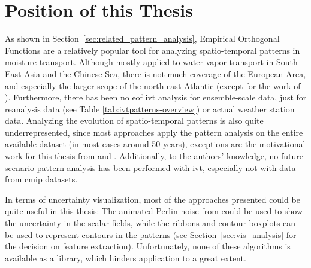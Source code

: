 %
%
%
%


\section{Position of this Thesis} %
\label{sec:Position of this Thesis}

As shown in Section~\ref{sec:related_pattern_analysis}, Empirical Orthogonal Functions are a relatively popular tool for analyzing spatio-temporal patterns in moisture transport. 
Although mostly applied to water vapor transport in South East Asia and the Chinese Sea, there is not much coverage of the European Area, and especially the larger scope of the north-east Atlantic (except for the work of \citeauthor{wypych_atmospheric_2018} \cite{wypych_atmospheric_2018}). 
Furthermore, there has been no \ac{eof} \ac{ivt} analysis for ensemble-scale data, just for reanalysis data (see Table \ref{tab:ivtpatterns-overview}) or actual weather station data.
Analyzing the evolution of spatio-temporal patterns is also quite underrepresented, since most approaches apply the pattern analysis on the entire available dataset (in most cases around 50 years), exceptions are the motivational work for this thesis from  and . 
Additionally, to the authors' knowledge, no future scenario pattern analysis has been performed with \ac{ivt}, especially not with data from \ac{cmip} datasets.  

In terms of uncertainty visualization, most of the approaches presented could be quite useful in this thesis: The animated Perlin noise from \cite{coninx_visualization_2011} could be used to show the uncertainty in the scalar fields, while the ribbons and contour boxplots can be used to represent contours in the patterns (see Section~\ref{sec:vis_analysis} for the decision on feature extraction). 
Unfortunately, none of these algorithms is available as a library, which hinders application to a great extent. 


